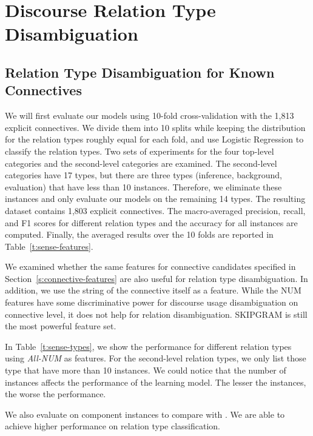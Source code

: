 \section{Discourse Relation Type Disambiguation}

\subsection{Relation Type Disambiguation for Known Connectives}

We will first evaluate our models using 10-fold cross-validation with the 1,813
explicit connectives. We divide them into 10 splits
while keeping the distribution for the relation types roughly equal for
each fold, and use Logistic Regression to classify the relation types.
Two sets of experiments for the four top-level
categories and the second-level categories are examined. The second-level categories
have 17 types, but there are three types (inference, background, evaluation)
that have less than 10 instances. Therefore, we eliminate these instances and only evaluate
our models on the remaining 14 types. The resulting dataset contains 1,803 explicit
connectives. The macro-averaged
precision, recall, and F1 scores for different relation types and the accuracy for
all instances are computed. Finally, the averaged results over
the 10 folds are reported in Table~\ref{t:sense-features}.

We examined whether the same features
for connective candidates specified in Section~\ref{s:connective-features} are
also useful for relation type disambiguation. In addition, we use the string
of the connective itself as a feature. While the NUM features have some
discriminative power for discourse usage disambiguation on connective level,
it does not help for relation disambiguation. SKIPGRAM is still the most powerful
feature set.



In Table~\ref{t:sense-types}, we show the performance for different relation types
using \textit{All-NUM} as features. For the second-level relation types, we only list
those type that have more than 10 instances. We could notice that the
number of instances affects the performance of the learning model. The
lesser the instances, the worse the performance.



We also evaluate on component instances to compare with \cite{li2015automatic}.
We are able to achieve higher performance on relation type classification.

